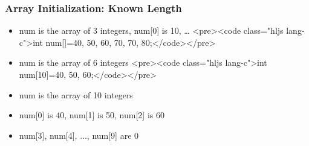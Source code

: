 \documentclass{../c-lecture}
\begin{document}
\begin{frame}
  \frametitle{Array Initialization: Known Length}
  \begin{itemize}
    <pre><code class="hljs lang-c">int num[3]={10, 20, 60};</code></pre>
    \item num is the array of 3 integers, num[0] is 10, …
    <pre><code class="hljs lang-c">int num[]={40, 50, 60, 70, 70, 80};</code></pre>
    \item num is the array of 6 integers
    <pre><code class="hljs lang-c">int num[10]={40, 50, 60};</code></pre>
    \item num is the array of 10 integers
    \item num[0] is 40, num[1] is 50, num[2] is 60
    \item num[3], num[4], ..., num[9] are 0
  \end{itemize}
\end{frame}
\end{document}
